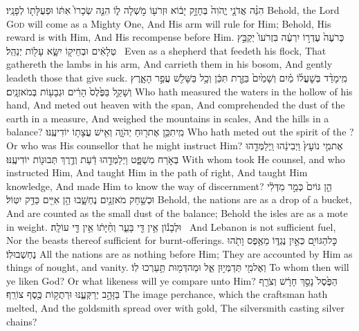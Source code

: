 {הִנֵּ֨ה אֲדֹנָ֤י יֱהֹוִה֙ בְּחָזָ֣ק יָב֔וֹא וּזְרֹע֖וֹ מֹ֣שְׁלָה ל֑וֹ הִנֵּ֤ה שְׂכָרוֹ֙ אִתּ֔וֹ וּפְעֻלָּת֖וֹ לְפָנָֽיו׃}
{Behold, the Lord \textsc{God} will come as a Mighty One, And His arm will rule for Him; Behold, His reward is with Him, And His recompense before Him.}
{כְּרֹעֶה֙ עֶדְר֣וֹ יִרְעֶ֔ה בִּזְרֹעוֹ֙ יְקַבֵּ֣ץ טְלָאִ֔ים וּבְחֵיק֖וֹ יִשָּׂ֑א עָל֖וֹת יְנַהֵֽל׃ \setuma }
{Even as a shepherd that feedeth his flock, That gathereth the lambs in his arm, And carrieth them in his bosom, And gently leadeth those that give suck.}
{מִֽי\maqqaf מָדַ֨ד בְּשׇׁעֳל֜וֹ מַ֗יִם וְשָׁמַ֙יִם֙ בַּזֶּ֣רֶת תִּכֵּ֔ן וְכָ֥ל בַּשָּׁלִ֖שׁ עֲפַ֣ר הָאָ֑רֶץ וְשָׁקַ֤ל בַּפֶּ֙לֶס֙ הָרִ֔ים וּגְבָע֖וֹת בְּמֹאזְנָֽיִם׃}
{Who hath measured the waters in the hollow of his hand, And meted out heaven with the span, And comprehended the dust of the earth in a measure, And weighed the mountains in scales, And the hills in a balance?}
{מִֽי\maqqaf תִכֵּ֥ן אֶת\maqqaf ר֖וּחַ יְהֹוָ֑ה וְאִ֖ישׁ עֲצָת֥וֹ יוֹדִיעֶֽנּוּ׃}
{Who hath meted out the spirit of the \lord? Or who was His counsellor that he might instruct Him?}
{אֶת\maqqaf מִ֤י נוֹעָץ֙ וַיְבִינֵ֔הוּ וַֽיְלַמְּדֵ֖הוּ בְּאֹ֣רַח מִשְׁפָּ֑ט וַיְלַמְּדֵ֣הוּ דַ֔עַת וְדֶ֥רֶךְ תְּבוּנ֖וֹת יוֹדִיעֶֽנּוּ׃}
{With whom took He counsel, and who instructed Him, And taught Him in the path of right, And taught Him knowledge, And made Him to know the way of discernment?}
{הֵ֤ן גּוֹיִם֙ כְּמַ֣ר מִדְּלִ֔י וּכְשַׁ֥חַק מֹאזְנַ֖יִם נֶחְשָׁ֑בוּ הֵ֥ן אִיִּ֖ים כַּדַּ֥ק יִטּֽוֹל׃}
{Behold, the nations are as a drop of a bucket, And are counted as the small dust of the balance; Behold the isles are as a mote in weight.}
{וּלְבָנ֕וֹן אֵ֥ין דֵּ֖י בָּעֵ֑ר וְחַ֨יָּת֔וֹ אֵ֥ין דֵּ֖י עוֹלָֽה׃ \petucha }
{And Lebanon is not sufficient fuel, Nor the beasts thereof sufficient for burnt-offerings.}
{כׇּל\maqqaf הַגּוֹיִ֖ם כְּאַ֣יִן נֶגְדּ֑וֹ מֵאֶ֥פֶס וָתֹ֖הוּ נֶחְשְׁבוּ\maqqaf לֽוֹ׃}
{All the nations are as nothing before Him; They are accounted by Him as things of nought, and vanity.}
{וְאֶל\maqqaf מִ֖י תְּדַמְּי֣וּן אֵ֑ל וּמַה\maqqaf דְּמ֖וּת תַּ֥עַרְכוּ לֽוֹ׃}
{To whom then will ye liken God? Or what likeness will ye compare unto Him?}
{הַפֶּ֙סֶל֙ נָסַ֣ךְ חָרָ֔שׁ וְצֹרֵ֖ף בַּזָּהָ֣ב יְרַקְּעֶ֑נּוּ וּרְתֻק֥וֹת כֶּ֖סֶף צוֹרֵֽף׃}
{The image perchance, which the craftsman hath melted, And the goldsmith spread over with gold, The silversmith casting silver chains?}
